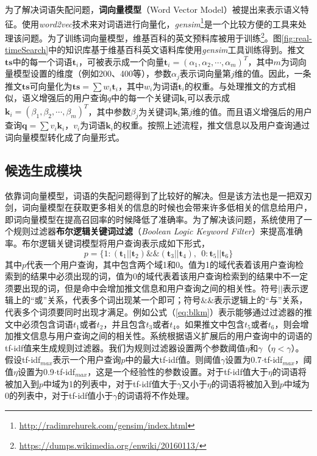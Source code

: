 为了解决词语失配问题，\textbf{词向量模型}（Word Vector Model）被提出来表示语义特征。使用\textit{word2vec}技术来对词语进行向量化，\textit{gensim}\footnote{\url{http://radimrehurek.com/gensim/index.html}}是一个比较方便的工具来处理该问题。为了训练词向量模型，维基百科的英文预料库被用于训练\footnote{\url{https://dumps.wikimedia.org/enwiki/20160113/}}。图\ref{fig:real-timeSearch}中的知识库基于维基百科英文语料库使用\textit{gensim}工具训练得到。推文$\mathbf{ts}$中的每一个词语$\mathbf{t}_i$，可被表示成一个向量$\mathbf{t}_i=\left(\alpha_1,\alpha_2,\cdots,\alpha_m\right)^T$，其中$m$为词向量模型设置的维度（例如200、400等），参数$\alpha_j$表示词向量第$j$维的值。因此，一条推文$\mathbf{ts}$可向量化为$\mathbf{ts}= \sum w_i \mathbf{t}_i$，其中$w_i$为词语$\mathbf{t}_i$的权重。与处理推文的方式相似，语义增强后的用户查询$q$中的每一个关键词$\mathbf{k}_i$可以表示成$\mathbf{k}_i = \left(\beta_1,\beta_2,\cdots,\beta_m\right)^T$，其中参数$\beta_j$为关键词$\mathbf{k}_i$第$j$维的值。而且语义增强后的用户查询$\mathbf{q} = \sum v_i \mathbf{k}_i$，$v_i$为词语$\mathbf{k}_i$的权重。按照上述流程，推文信息以及用户查询通过词向量模型转化成了向量形式。

\subsection{候选生成模块}
\label{subsec2:candidate}
依靠词向量模型，词语的失配问题得到了比较好的解决。但是该方法也是一把双刃剑，词向量模型在获取更多相关的信息的时候也会带来许多低相关的信息给用户，即词向量模型在提高召回率的时候降低了准确率。为了解决该问题，系统使用了一个规则过滤器\textbf{布尔逻辑关键词过滤}（\textit{Boolean Logic Keyword Filter}）来提高准确率。布尔逻辑关键词模型将用户查询表示成如下形式，
\begin{equation}
\label{eq:blkm}
  p = \{1:\left(\mathbf{t}_1 || \mathbf{t}_2\right) \& \& \left(\mathbf{t}_3 || \mathbf{t}_4\right),~~0:\mathbf{t}_5 || \mathbf{t}_6\}
\end{equation}
其中$p$代表一个用户查询，其中包含两个域1和0。值为1的域代表着该用户查询检索到的结果中必须出现的词，值为0的域代表着该用户查询检索到的结果中不一定须要出现的词，但是命中会增加推文信息和用户查询之间的相关性。符号$||$表示逻辑上的“或”关系，代表多个词出现某一个即可；符号$\&\&$表示逻辑上的“与”关系，代表多个词须要同时出现才满足。例如公式（\ref{eq:blkm}）表示能够通过过滤器的推文中必须包含词语$t_1$或者$t_2$，并且包含$t_3$或者$t_4$。如果推文中包含$t_5$或者$t_6$，则会增加推文信息与用户查询之间的相关性。系统根据语义扩展后的用户查询中的词语的tf-idf值来生成规则过滤器。我们为规则过滤器设置两个参数阈值$\eta$和$\gamma$（$\eta < \gamma$）。假设tf-idf$_{max}$表示一个用户查询$p$中的最大tf-idf值。则阈值$\gamma$设置为0.7$\cdot$tf-idf$_{max}$，阈值$\eta$设置为0.9$\cdot$tf-idf$_{max}$，这是一个经验性的参数设置。对于tf-idf值大于$\eta$的词语将被加入到$p$中域为1的列表中，对于tf-idf值大于$\gamma$又小于$\eta$的词语将被加入到$p$中域为0的列表中，对于tf-idf值小于$\gamma$的词语将不作处理。

